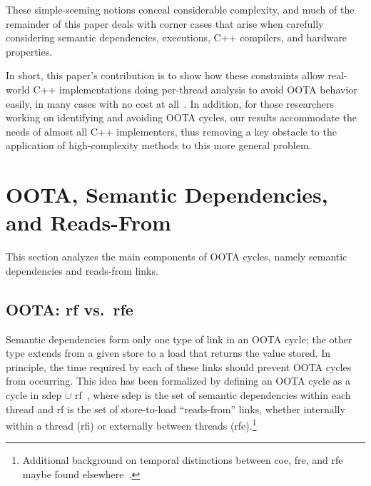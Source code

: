 These simple-seeming notions conceal considerable complexity,
and much of the remainder of this paper deals with corner cases that
arise when carefully considering semantic dependencies, executions, C++
compilers, and hardware properties.

In short, this paper's contribution is to show how these
constraints allow real-world C++ implementations doing per-thread
analysis to avoid OOTA behavior easily,
in many cases with no cost at
all~\cite{PaulEMcKenney2023P3046R2/OOTAwithoutTrying}.
In addition, for those researchers working on identifying and avoiding
OOTA cycles, our results accommodate the needs of almost all C++
implementers, thus removing a key obstacle to the application of
high-complexity methods to this more general problem.

\section{OOTA, Semantic Dependencies, and Reads-From}
\label{sec:OOTA, Semantic Dependencies, and Reads-From}

This section analyzes the main components of OOTA cycles, namely
semantic dependencies and reads-from links.

\subsection{OOTA: rf vs.\ rfe}
\label{sec:OOTA: rf vs. rfe}

Semantic dependencies form only one type of link in an OOTA cycle;
the other type extends from a given store to a load that returns the
value stored.
In principle, the time required by each of these links should prevent
OOTA cycles from occurring.
This idea has been formalized by defining an OOTA cycle as a cycle
in sdep $\cup$ rf~\cite{PaulEMcKenney2014OOTA},
where sdep is the set of semantic dependencies within each thread and
rf is the set of store-to-load ``reads-from'' links, whether internally
within a thread (rfi) or externally between threads (rfe).\footnote{
	Additional background on temporal distinctions between coe, fre,
	and rfe maybe found elsewhere~\cite[Appendix A]{PaulEMcKenney2023P3046R2/OOTAwithoutTrying}.}

